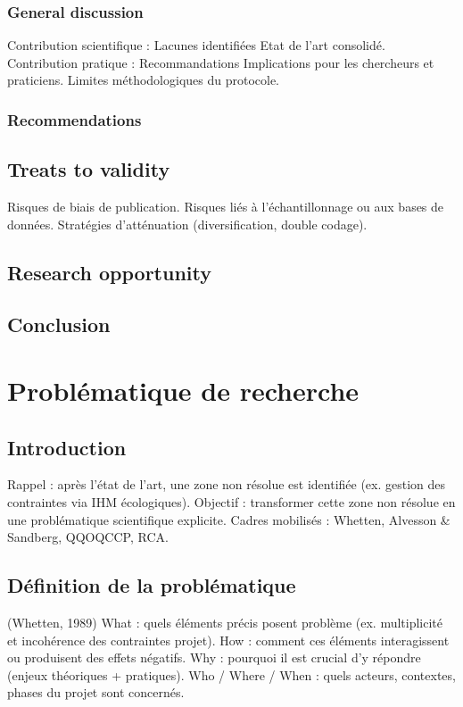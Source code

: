 \documentclass[a4paper,12pt]{article}
\begin{document}
\subsubsection{General discussion}
\label{sec:org3ae55de}
Contribution scientifique :
    Lacunes identifiées
    Etat de l’art consolidé.
Contribution pratique :
    Recommandations
    Implications pour les chercheurs et praticiens.
Limites méthodologiques du protocole.
\subsubsection{Recommendations}
\label{sec:org4f78ec3}
\subsection{Treats to validity}
\label{sec:org25097d7}
Risques de biais de publication.
Risques liés à l’échantillonnage ou aux bases de données.
Stratégies d’atténuation (diversification, double codage).
\subsection{Research opportunity}
\label{sec:orgdc2fccc}

\subsection{Conclusion}
\label{sec:org93f2212}
\clearpage
\section{Problématique de recherche}
\label{sec:orgb1e88b6}
\subsection{Introduction}
\label{sec:org6a2852d}
Rappel : après l’état de l’art, une zone non résolue est identifiée (ex. gestion des contraintes via IHM écologiques).
Objectif : transformer cette zone non résolue en une problématique scientifique explicite.
Cadres mobilisés : Whetten, Alvesson \& Sandberg, QQOQCCP, RCA.
\subsection{Définition de la problématique}
\label{sec:orgf985608}
(Whetten, 1989)
What : quels éléments précis posent problème (ex. multiplicité et incohérence des contraintes projet).
How : comment ces éléments interagissent ou produisent des effets négatifs.
Why : pourquoi il est crucial d’y répondre (enjeux théoriques + pratiques).
Who / Where / When : quels acteurs, contextes, phases du projet sont concernés.
\end{document}
